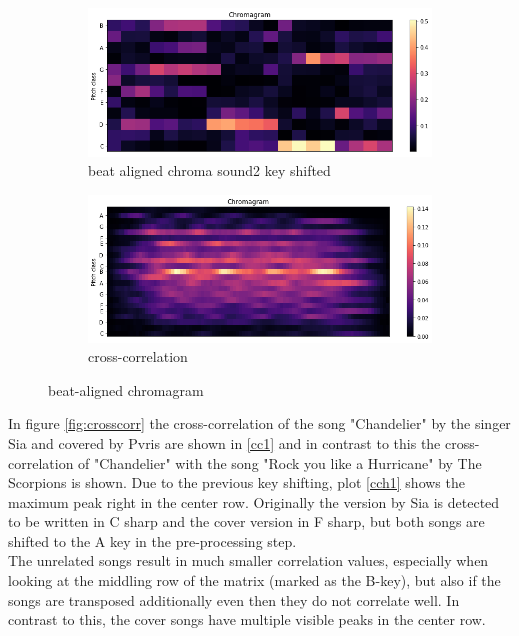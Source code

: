 \begin{figure}[htbp]
{{			\begin{subfigure}{.495\textwidth}
				\centering     
				\includegraphics[scale=0.3]{Images/Chroma/beatalignedchroma2_ks.png}
				\caption{beat aligned chroma sound2 key shifted}
				\label{cks2}
			\end{subfigure}%
			\begin{subfigure}{.495\textwidth}
				\centering     
				\includegraphics[scale=0.3]{Images/Chroma/beatalignedchroma_corr.png}
				\caption{cross-correlation}
				\label{c2}
			\end{subfigure}%
	}}
	\caption{beat-aligned chromagram}
	\label{fig:beatalign}
\end{figure}
In figure \ref{fig:crosscorr} the cross-correlation of the song "Chandelier" by the singer Sia and covered by Pvris are shown in \ref{cc1} and in contrast to this the cross-correlation of "Chandelier" with the song "Rock you like a Hurricane" by The Scorpions is shown. Due to the previous key shifting, plot \ref{cch1} shows the maximum peak right in the center row. Originally the version by Sia is detected to be written in C sharp and the cover version in F sharp, but both songs are shifted to the A key in the pre-processing step.\\
The unrelated songs result in much smaller correlation values, especially when looking at the middling row of the matrix (marked as the B-key), but also if the songs are transposed additionally even then they do not correlate well. In contrast to this, the cover songs have multiple visible peaks in the center row. 
